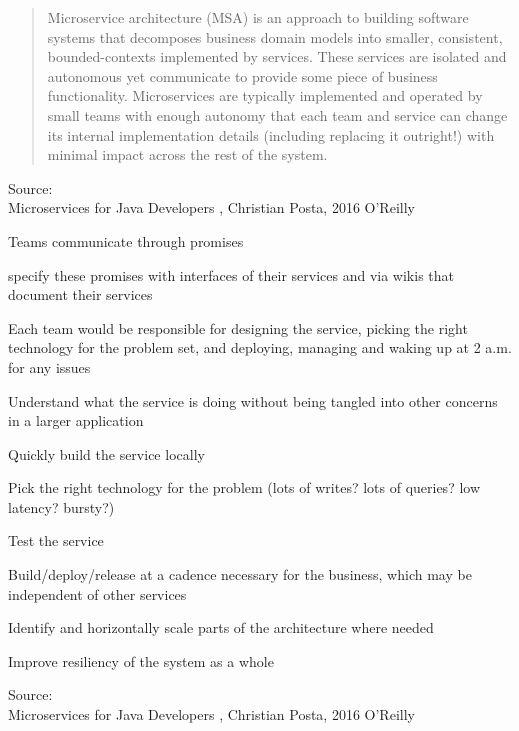 \documentclass[Screen16to9,17pt]{foils}
\begin{document}


\begin{quote}\small
  Microservice architecture (MSA) is an approach to building software systems that decomposes business domain models into smaller,
  consistent, bounded-contexts implemented by services. These services are isolated and autonomous yet communicate to provide some
  piece of business functionality. Microservices are typically implemented and operated by small teams with enough autonomy that
  each team and service can change its internal implementation
  details (including replacing it outright!) with minimal impact across
  the rest of the system.
\end{quote}

Source: {\footnotesize\\
Microservices for Java Developers , Christian Posta, 2016 O’Reilly}







\begin{list2}
\item Teams communicate through promises
\item specify these promises with interfaces
of their services and via wikis that document their services
\item Each team would be responsible for designing the service, picking
the right technology for the problem set, and deploying, managing
and waking up at 2 a.m. for any issues
\item Understand what the service is doing without being tangled into
other concerns in a larger application
\item Quickly build the service locally
\item Pick the right technology for the problem (lots of writes? lots of
queries? low latency? bursty?)
\item Test the service
\item Build/deploy/release at a cadence necessary for the business,
which may be independent of other services
\item Identify and horizontally scale parts of the architecture where
needed
\item Improve resiliency of the system as a whole



\end{list2}
Source: {\footnotesize\\
Microservices for Java Developers , Christian Posta, 2016 O’Reilly}
\end{document}
